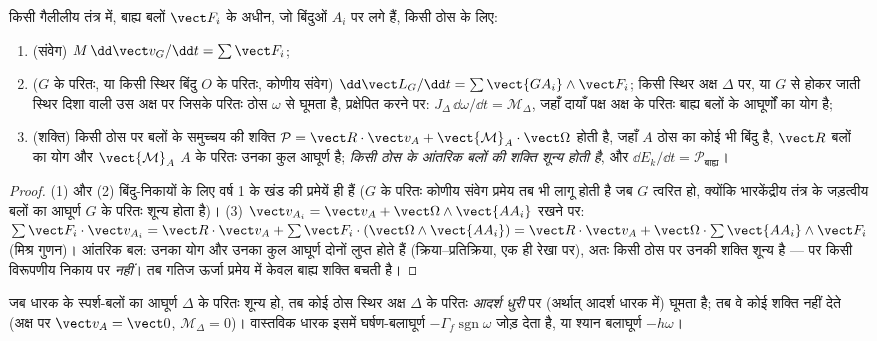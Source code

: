 \begin{theorem}[ठोस की गति के नियम]\label{thm:b2:rigid-body-mechanics:laws}
किसी गैलीलीय तंत्र में, बाह्य बलों $\vect F_i$ के अधीन, जो बिंदुओं
$A_i$ पर लगे हैं, किसी ठोस के लिए:
\begin{enumerate}
  \item (संवेग) $M\,\dd\vect v_G/\dd t = \sum\vect F_i$;
  \item ($G$ के परितः, या किसी स्थिर बिंदु $O$ के परितः, कोणीय संवेग)
        $\dd\vect L_G/\dd t = \sum\vect{GA_i}\wedge\vect F_i$; किसी स्थिर
        अक्ष $\Delta$ पर, या $G$ से होकर जाती स्थिर दिशा वाली उस अक्ष पर
        जिसके परितः ठोस $\omega$ से घूमता है, प्रक्षेपित करने पर:
        $J_\Delta\,\dd\omega/\dd t = \mathcal M_\Delta$, जहाँ दायाँ पक्ष अक्ष
        के परितः बाह्य बलों के आघूर्णों का योग है;
  \item (शक्ति) किसी ठोस पर बलों के समुच्चय की शक्ति
        $\mathcal P = \vect R\cdot\vect v_A + \vect{\mathcal M}_A\cdot
        \vect\Omega$ होती है, जहाँ $A$ ठोस का कोई भी बिंदु है, $\vect R$
        बलों का योग और $\vect{\mathcal M}_A$ $A$ के परितः उनका कुल आघूर्ण है;
        \emph{किसी ठोस के आंतरिक बलों की शक्ति शून्य होती है}, और
        $\dd E_k/\dd t = \mathcal P_{\text{बाह्य}}$।
\end{enumerate}
\end{theorem}

\begin{proof}
(1) और (2) बिंदु-निकायों के लिए वर्ष 1 के खंड की प्रमेयें ही हैं
($G$ के परितः कोणीय संवेग प्रमेय तब भी लागू होती है जब $G$ त्वरित हो,
क्योंकि भारकेंद्रीय तंत्र के जड़त्वीय बलों का आघूर्ण $G$ के परितः शून्य
होता है)। (3) $\vect v_{A_i} = \vect v_A + \vect\Omega
\wedge\vect{AA_i}$ रखने पर: $\sum\vect F_i\cdot\vect v_{A_i} = \vect R\cdot\vect v_A
+ \sum\vect F_i\cdot(\vect\Omega\wedge\vect{AA_i}) = \vect R\cdot\vect v_A +
\vect\Omega\cdot\sum\vect{AA_i}\wedge\vect F_i$ (मिश्र गुणन)। आंतरिक
बल: उनका योग और उनका कुल आघूर्ण दोनों लुप्त होते हैं (क्रिया--प्रतिक्रिया,
एक ही रेखा पर), अतः किसी ठोस पर उनकी शक्ति शून्य है --- पर किसी
विरूपणीय निकाय पर \emph{नहीं}। तब गतिज ऊर्जा प्रमेय में केवल बाह्य शक्ति बचती है।
\end{proof}

\begin{definition}[आदर्श धुरी]\label{def:b2:rigid-body-mechanics:pivot}
जब धारक के स्पर्श-बलों का आघूर्ण $\Delta$ के परितः शून्य हो, तब कोई ठोस
स्थिर अक्ष $\Delta$ के परितः \emph{आदर्श धुरी} पर (अर्थात् आदर्श धारक
में) घूमता है; तब वे कोई शक्ति नहीं देते (अक्ष पर $\vect v_A = \vect 0$,
$\mathcal M_\Delta = 0$)। वास्तविक धारक इसमें घर्षण-बलाघूर्ण
$-\Gamma_f\operatorname{sgn}\omega$ जोड़ देता है, या श्यान बलाघूर्ण $-h\omega$।
\end{definition}


